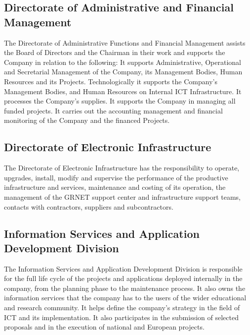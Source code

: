 \subsection{Directorate of Administrative and Financial Management}
The Directorate of Administrative Functions and Financial Management assists the Board of Directors and the Chairman
in their work and supports the Company in relation to the following:
It supports Administrative, Operational and Secretarial Management of the Company,
its Management Bodies, Human Resources and its Projects. Technologically it supports the Company's Management Bodies,
and Human Resources on Internal ICT Infrastructure.
It processes the Company's supplies.
It supports the Company in managing all funded projects.
It carries out the accounting management and financial monitoring of the Company and the financed Projects.

\subsection{Directorate of Electronic Infrastructure}
The Directorate of Electronic Infrastructure has the responsibility to operate, upgrades, install, modify
and supervise the performance of the productive infrastructure and services,
maintenance and costing of its operation, the management of the GRNET support center and infrastructure support teams,
contacts with contractors, suppliers and subcontractors.

\subsection{Information Services and Application Development Division}
The Information Services and Application Development Division is responsible for the full life cycle of the projects
and applications deployed internally in the company, from the planning phase to the maintenance process.
It also owns the information services that the company has to the users of the wider educational and research community.
It helps define the company's strategy in the field of ICT and its implementation.
It also participates in the submission of selected proposals and in the execution of national and European projects.



